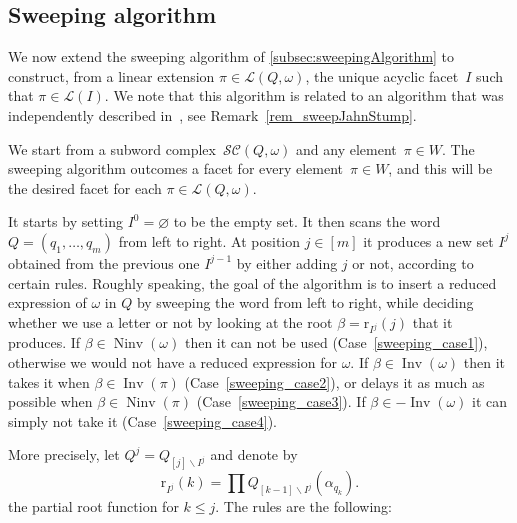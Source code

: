 \documentclass[reqno]{amsart}
\theoremstyle{definition}
\newcommand{\ssm}{\smallsetminus} %
\DeclareMathOperator{\Inv}{Inv} %
\DeclareMathOperator{\Ninv}{Ninv} %
\newcommand{\linearExtensions}{\mathcal{L}} %
\newcommand{\subwordComplex}{\mathcal{SC}} %
\newcommand{\rootFunction}[2]{\mathrm{r}_{#1}(#2)} %
\newcommand{\subwordFacets}{\mathcal{F}} %
\newcommand{\sweepingAlgorithm}{\mathsf{sweep}} %
\begin{document}

\subsection{Sweeping algorithm}
\label{subsec:sweepingAlgorithmSubwordComplexes}

We now extend the sweeping algorithm of \cref{subsec:sweepingAlgorithm} to construct, from a linear extension $\pi \in \linearExtensions(Q,\omega)$, the unique acyclic facet~$I$ such that $\pi \in \linearExtensions(I)$.
We note that this algorithm is related to an algorithm that was independently described in~\cite{JahnStump}, see Remark~\ref{rem_sweepJahnStump}.

We start from a subword complex~$\subwordComplex(Q, \omega)$ and any element~$\pi \in W$.
The sweeping algorithm outcomes a facet for every element~$\pi \in W$, and this will be the desired facet for each $\pi \in \linearExtensions(Q,\omega)$.

It starts by setting $I^0=\varnothing$ to be the empty set.
It then scans the word $Q=(q_1,\dots ,q_m)$ from left to right.
At position $j\in [m]$ it produces a new set $I^j$ obtained from the previous one $I^{j-1}$ by either adding $j$ or not, according to certain rules.
Roughly speaking, the goal of the algorithm is to insert a reduced expression of $\omega$ in $Q$ by sweeping the word from left to right, while deciding whether we use a letter or not by looking at the root $\beta=\rootFunction{I^j}{j}$ that it produces.
If $\beta \in \Ninv(\omega)$ then it can not be used (Case~\ref{sweeping_case1}), otherwise we would not have a reduced expression for $\omega$.
If $\beta \in \Inv(\omega)$ then it takes it when $\beta \in \Inv(\pi)$ (Case~\ref{sweeping_case2}), or delays it as much as possible when $\beta \in \Ninv(\pi)$ (Case~\ref{sweeping_case3}).
If $\beta \in -\Inv(\omega)$ it can simply not take it (Case~\ref{sweeping_case4}).

More precisely, let $Q^j=Q_{[j]\ssm I^j}$ and denote by
\[
\rootFunction{I^j}{k} = \prod Q_{[k-1]\ssm I^j}(\alpha_{q_k}).
\]
the partial root function for $k\leq j$.  
The rules are the following:
\end{document}
